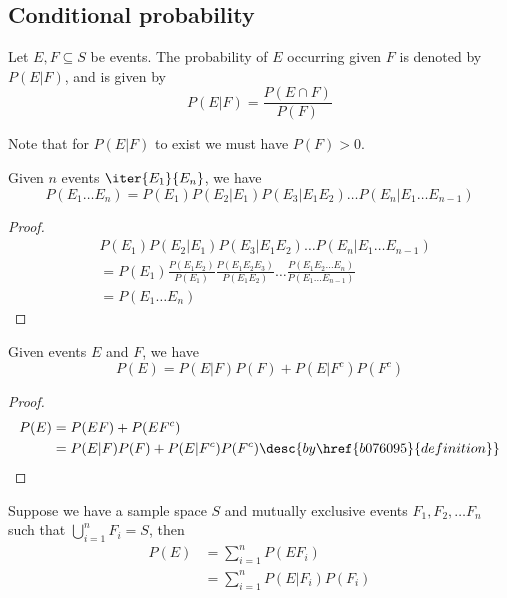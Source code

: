 \subsection{Conditional probability}\label{e673f7b}

\label{b076095}

Let $E,F\subseteq S$ be events. The probability of $E$ occurring given $F$ is
denoted by $P(E|F)$, and is given by
$$
  P(E|F)=\frac{P(E\cap F)}{P(F)}
$$

Note that for $P(E|F)$ to exist we must have $P(F)>0$.

\label{c57ff7d}

Given $n$ events $\iter{E_1}{E_n}$, we have
$$
  P(E_1\ldots E_n)=P(E_1)P(E_2|E_1)P(E_3|E_1E_2)\ldots P(E_n|E_1\ldots E_{n-1})
$$

\begin{proof}
  \begin{align*}
     &P(E_1)P(E_2|E_1)P(E_3|E_1E_2)\ldots P(E_n|E_1\ldots E_{n-1})  \\
     &=P(E_1)\frac{P(E_1E_2)}{P(E_1)}\frac{P(E_1E_2E_3)}{P(E_1E_2)}
    \ldots\frac{P(E_1E_2\ldots E_n)}{P(E_1\ldots E_{n-1})}          \\
     &=P(E_1\ldots E_n)
  \end{align*}
\end{proof}

\label{b1fd2bd}

Given events $E$ and $F$, we have
$$
  P(E)=P(E|F)P(F)+P(E|F^c)P(F^c)
$$

\begin{proof}
  \begin{align*}
    P(E) &=P(EF)+P(EF^c)                                                 \\
         &=P(E|F)P(F)+P(E|F^c)P(F^c)\desc{by \href{b076095}{definition}}
  \end{align*}
\end{proof}

\label{bf75209}

Suppose we have a sample space $S$ and mutually exclusive events
$F_1,F_2,\ldots F_n$ such that $\bigcup_{i=1}^nF_i=S$, then
\begin{align*}
  P(E) &=\sum_{i=1}^nP(EF_i)        \\
       &=\sum_{i=1}^nP(E|F_i)P(F_i)
\end{align*}

